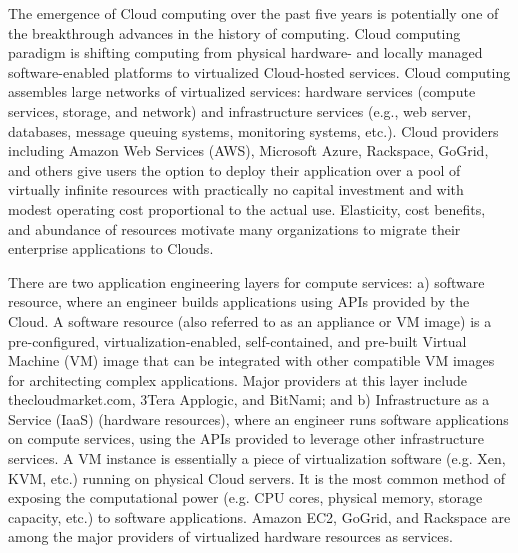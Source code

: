 \documentclass[10pt]{article}
\begin{document}
The emergence of Cloud computing \cite{armbrust2009above} over the past five years is potentially one of the breakthrough advances in the history of computing. Cloud computing paradigm is shifting computing from physical hardware- and locally managed software-enabled platforms to virtualized Cloud-hosted services. Cloud computing assembles large networks of virtualized services: hardware services (compute services, storage, and network) and infrastructure services (e.g., web server, databases, message queuing systems, monitoring systems, etc.). Cloud providers including Amazon Web Services (AWS), Microsoft Azure, Rackspace, GoGrid, and others give users the option to deploy their application over a pool of virtually infinite resources with practically no capital investment and with modest operating cost proportional to the actual use. Elasticity, cost benefits, and abundance of resources motivate many organizations to migrate their enterprise applications to Clouds.  

There are two application engineering layers for compute services: a) software resource, where an engineer builds applications using APIs provided by the Cloud. A software resource (also referred to as an appliance or VM image) is a pre-configured, virtualization-enabled, self-contained, and pre-built Virtual Machine (VM) image  that can be integrated with other compatible VM images for architecting complex applications. Major providers at this layer include thecloudmarket.com, 3Tera Applogic, and BitNami; and b) Infrastructure as a Service (IaaS) (hardware resources), where an engineer runs software applications on compute services, using the APIs provided to leverage other infrastructure services. A VM instance is essentially a piece of virtualization software (e.g. Xen, KVM, etc.) running on physical Cloud servers. It is the most common method of exposing the computational power (e.g. CPU cores, physical memory, storage capacity, etc.) to software applications. Amazon EC2, GoGrid, and Rackspace are among the major providers of virtualized hardware resources as services.
\end{document}
